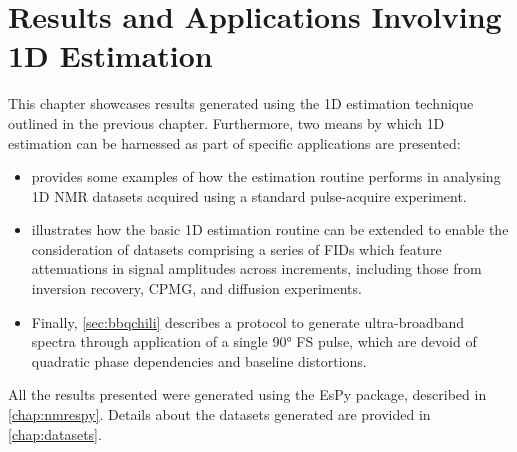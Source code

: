 \chapter{Results and Applications Involving 1D Estimation}
\label{chap:results}

This chapter showcases results generated using the \ac{1D} estimation
technique outlined in the previous chapter. Furthermore, two means by
which \ac{1D} estimation can be harnessed as part of
specific applications are presented:
\begin{itemize}
    \item {} provides some examples of how the estimation
        routine performs in analysing \ac{1D} \ac{NMR} datasets acquired using
        a standard pulse-acquire experiment.
    \item {} illustrates how the basic \ac{1D} estimation routine can be
        extended to enable the consideration of datasets comprising a series of
        \acp{FID} which feature attenuations in signal amplitudes across increments,
        including those from inversion recovery, \ac{CPMG}, and diffusion experiments.
    \item Finally,
        \cref{sec:bbqchili} describes a protocol to generate ultra-broadband spectra
        through application of a single \ang{90} \acl{FS} pulse, which are devoid of
        quadratic phase dependencies and baseline distortions.
\end{itemize}

All the results presented were generated using the \ac{EsPy} package,
described in \cref{chap:nmrespy}. Details about the datasets generated are
provided in \cref{chap:datasets}.





